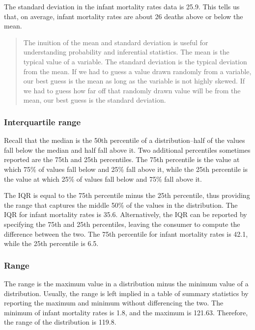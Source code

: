 \documentclass[
]{book}
\begin{document}
The standard deviation in the infant mortality rates data is 25.9. This tells us that, on average, infant mortality rates are about 26 deaths above or below the mean.

\begin{quote}
The inuition of the mean and standard deviation is useful for understanding probability and inferential statistics. The mean is the typical value of a variable. The standard deviation is the typical deviation from the mean. If we had to guess a value drawn randomly from a variable, our best guess is the mean as long as the variable is not highly skewed. If we had to guess how far off that randomly drawn value will be from the mean, our best guess is the standard deviation.
\end{quote}

\hypertarget{interquartile-range}{%
\subsubsection*{Interquartile range}\label{interquartile-range}}

Recall that the median is the 50th percentile of a distribution--half of the values fall below the median and half fall above it. Two additional percentiles sometimes reported are the 75th and 25th percentiles. The 75th percentile is the value at which 75\% of values fall below and 25\% fall above it, while the 25th percentile is the value at which 25\% of values fall below and 75\% fall above it.

The IQR is equal to the 75th percentile minus the 25th percentile, thus providing the range that captures the middle 50\% of the values in the distribution. The IQR for infant mortality rates is 35.6. Alternatively, the IQR can be reported by specifying the 75th and 25th percentiles, leaving the consumer to compute the difference between the two. The 75th percentile for infant mortality rates is 42.1, while the 25th percentile is 6.5.

\hypertarget{range}{%
\subsubsection*{Range}\label{range}}

The range is the maximum value in a distribution minus the minimum value of a distribution. Usually, the range is left implied in a table of summary statistics by reporting the maximum and minimum without differencing the two. The minimum of infant mortality rates is 1.8, and the maximum is 121.63. Therefore, the range of the distribution is 119.8.
\end{document}
